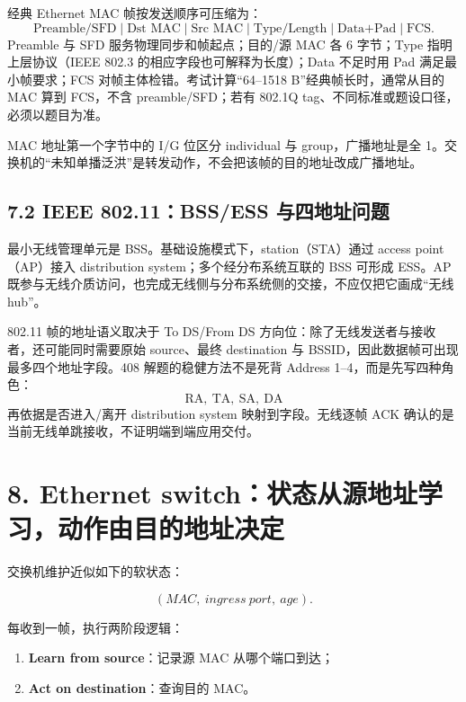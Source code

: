 \documentclass[UTF8,fontset=none,11pt,a4paper]{ctexart}
\providecommand{\tightlist}{\setlength{\itemsep}{0pt}\setlength{\parskip}{0pt}}
\begin{document}
经典 Ethernet MAC 帧按发送顺序可压缩为：
\[
\boxed{\text{Preamble/SFD}\mid\text{Dst MAC}\mid\text{Src MAC}\mid
\text{Type/Length}\mid\text{Data+Pad}\mid\text{FCS}}.
\]
Preamble 与 SFD 服务物理同步和帧起点；目的/源 MAC 各 6 字节；Type 指明上层协议（IEEE 802.3 的相应字段也可解释为长度）；Data 不足时用 Pad 满足最小帧要求；FCS 对帧主体检错。考试计算“64--1518 B”经典帧长时，通常从目的 MAC 算到 FCS，不含 preamble/SFD；若有 802.1Q tag、不同标准或题设口径，必须以题目为准。

MAC 地址第一个字节中的 I/G 位区分 individual 与 group，广播地址是全 1。交换机的“未知单播泛洪”是转发动作，不会把该帧的目的地址改成广播地址。

\subsection{7.2 IEEE 802.11：BSS/ESS 与四地址问题}

最小无线管理单元是 BSS。基础设施模式下，station（STA）通过 access point（AP）接入 distribution system；多个经分布系统互联的 BSS 可形成 ESS。AP 既参与无线介质访问，也完成无线侧与分布系统侧的交接，不应仅把它画成“无线 hub”。

802.11 帧的地址语义取决于 To DS/From DS 方向位：除了无线发送者与接收者，还可能同时需要原始 source、最终 destination 与 BSSID，因此数据帧可出现最多四个地址字段。408 解题的稳健方法不是死背 Address 1--4，而是先写四种角色：
\[
\boxed{\text{RA},\ \text{TA},\ \text{SA},\ \text{DA}}
\]
再依据是否进入/离开 distribution system 映射到字段。无线逐帧 ACK 确认的是当前无线单跳接收，不证明端到端应用交付。

\section{8. Ethernet
switch：状态从源地址学习，动作由目的地址决定}\label{7-ethernet-switchux72b6ux6001ux4eceux6e90ux5730ux5740ux5b66ux4e60ux52a8ux4f5cux7531ux76eeux7684ux5730ux5740ux51b3ux5b9a}

交换机维护近似如下的软状态：

\[
(MAC,\ ingress\ port,\ age).
\]

每收到一帧，执行两阶段逻辑：

\begin{enumerate}
\def\labelenumi{\arabic{enumi}.}
\tightlist
\item
  \textbf{Learn from source}：记录源 MAC 从哪个端口到达；
\item
  \textbf{Act on destination}：查询目的 MAC。
\end{enumerate}
\end{document}
